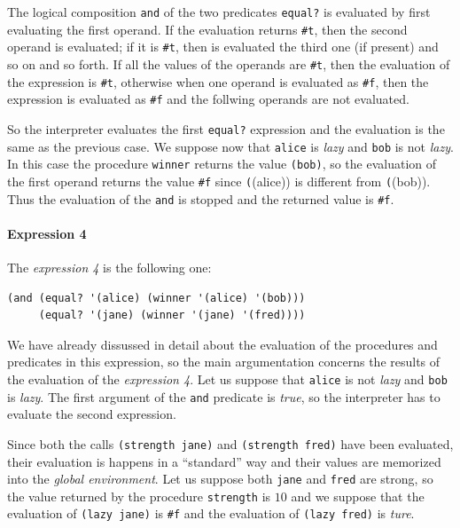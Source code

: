\begin{itemize}
        The logical composition \texttt{and} of the two predicates \texttt{equal?} is evaluated by first evaluating the first operand.
        If the evaluation returns \texttt{\#t}, then the second operand is evaluated; if it is \texttt{\#t}, then is evaluated the 
        third one (if present) and so on and so forth.
        If all the values of the operands are \texttt{\#t}, then the evaluation of the expression is \texttt{\#t}, otherwise when
        one operand is evaluated as \texttt{\#f}, then the expression is evaluated as \texttt{\#f} and the follwing operands are not
        evaluated.
        
        So the interpreter evaluates the first \texttt{equal?} expression and the evaluation is the same as the previous case.
        We suppose now that \texttt{\textquotesingle alice} is \textit{lazy} and \texttt{\textquotesingle bob} is not \textit{lazy}. In this case the procedure
        \texttt{winner} returns the value \texttt{\textquotesingle (bob)}, so the evaluation of the first operand returns the value \texttt{\#f} since
        \texttt(\textquotesingle (alice)) is different from \texttt(\textquotesingle (bob)).
        Thus the evaluation of the \texttt{and} is stopped and the returned value is \texttt{\#f}.


        \paragraph*{Expression 4} The \textit{expression 4} is the following one: 
        \begin{lstlisting}
(and (equal? '(alice) (winner '(alice) '(bob)))
     (equal? '(jane) (winner '(jane) '(fred))))
        \end{lstlisting}

        We have already dissussed in detail about the evaluation of the procedures and predicates in this expression, so the main
        argumentation concerns the results of the evaluation of the \textit{expression 4}.
        Let us suppose that \texttt{\textquotesingle alice} is not \textit{lazy} and \texttt{\textquotesingle bob} is \textit{lazy}. The first argument of the
        \texttt{and} predicate is \textit{true}, so the interpreter has to evaluate the second expression.
        
        Since both the calls \texttt{(strength \textquotesingle jane)} and \texttt{(strength \textquotesingle fred)} have been evaluated, their evaluation is 
        happens in a ``standard'' way and their values are memorized into the \textit{global environment}.
        Let us suppose both \texttt{\textquotesingle jane} and \texttt{\textquotesingle fred} are strong, so the value returned by the procedure \texttt{strength}
        is $10$ and we suppose that the evaluation of \texttt{(lazy \textquotesingle jane)} is \texttt{\#f} and the evaluation of 
        \texttt{(lazy \textquotesingle fred)} is \textit{ture}.


\end{itemize}
